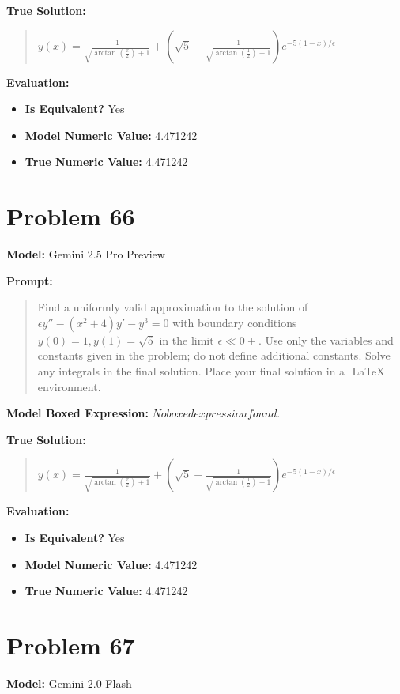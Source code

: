 \documentclass{article}
\begin{document}
\textbf{True Solution:}
\begin{quote}
$y(x)=\frac{1}{\sqrt{\arctan\left(\frac{x}{2}\right)+1}}+\left(\sqrt{5}-\frac{1}{\sqrt{\arctan\left(\frac{1}{2}\right)+1}}\right)e^{-5(1-x)/\epsilon}$
\end{quote}

\textbf{Evaluation:}
\begin{itemize}
\item \textbf{Is Equivalent?} Yes
\item \textbf{Model Numeric Value:} 4.471242
\item \textbf{True Numeric Value:} 4.471242
\end{itemize}
\vspace{1cm}
\section*{Problem 66}
\textbf{Model:} Gemini 2.5 Pro Preview

\textbf{Prompt:}
\begin{quote}
Find a uniformly valid approximation to the solution of $\epsilon y'' - (x^2+4)y' - y^3 = 0$ with boundary conditions $y(0)=1, y(1)=\sqrt{5}$ in the limit $\epsilon \ll 0+$. Use only the variables and constants given in the problem; do not define additional constants. Solve any integrals in the final solution. Place your final solution in a $\boxed{}$ LaTeX environment.
\end{quote}
\textbf{Model Boxed Expression:} $No boxed expression found.$

\textbf{True Solution:}
\begin{quote}
$y(x)=\frac{1}{\sqrt{\arctan\left(\frac{x}{2}\right)+1}}+\left(\sqrt{5}-\frac{1}{\sqrt{\arctan\left(\frac{1}{2}\right)+1}}\right)e^{-5(1-x)/\epsilon}$
\end{quote}

\textbf{Evaluation:}
\begin{itemize}
\item \textbf{Is Equivalent?} Yes
\item \textbf{Model Numeric Value:} 4.471242
\item \textbf{True Numeric Value:} 4.471242
\end{itemize}
\vspace{1cm}
\section*{Problem 67}
\textbf{Model:} Gemini 2.0 Flash
\end{document}
